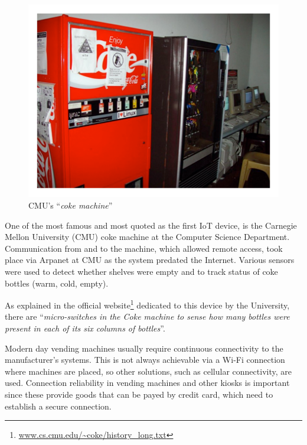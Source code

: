 			\noindent
			\begin{minipage}{0.5\textwidth}%
				\centering
				\begin{figure}[H]
					\centering
					\includegraphics[width=\textwidth]{resources/img/chap2/coke}
					\caption{CMU's ``\textit{coke machine}''}
					\label{img:coke_machine}
				\end{figure}
			\end{minipage}%
			\hfill%
			\begin{minipage}{0.5\textwidth}\raggedright
				One of the most famous and most quoted as the first IoT device, is the Carnegie Mellon University (CMU) coke machine at the Computer Science Department.
				Communication from and to the machine, which allowed remote access, took place via Arpanet at CMU as the system predated the Internet.
				Various sensors were used to detect whether shelves were empty and to track status of coke bottles (warm, cold, empty).
			\end{minipage}
			\newline
			
			As explained in the official website\footnote{ \url{www.cs.cmu.edu/~coke/history_long.txt}} dedicated to this device by the University, there are ``\textit{micro-switches in the Coke machine to sense how many bottles were present in each of its six columns of bottles}''.
		
			Modern day vending machines usually require continuous connectivity to the manufacturer's systems.
			This is not always achievable via a Wi-Fi connection where machines are placed, so other solutions, such as cellular connectivity, are used.
			Connection reliability in vending machines and other kiosks is important since these provide goods that can be payed by credit card, which need to establish a secure connection.
			
